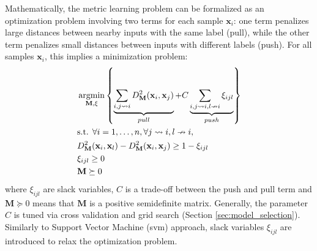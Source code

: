 %
Mathematically, the metric learning problem can be formalized as an optimization problem involving two terms for each sample $\textbf{x}_i$: one term penalizes large distances between nearby inputs with the same label (pull), while the other term penalizes small distances between inputs with different labels (push). For all samples $\textbf{x}_i$, this implies a minimization problem:
\begin{equation}
\begin{aligned}
&\displaystyle 		 \argmin_{\textbf{M},\xi} \left\lbrace \underbrace{
	\sum\limits_{i,j \rightsquigarrow i}
	D^2_\textbf{M}(\textbf{x}_i,\textbf{x}_j)
}_{pull}
+
C
\underbrace{
	\sum\limits_{i,j \rightsquigarrow i,l \nrightarrow i} \xi_{ijl}
}
_{push} \right\rbrace \\
&\text{s.t.  } \forall i = 1,\ldots, n, \forall j \rightsquigarrow i, l \nrightarrow i, \\
& D^2_\textbf{M}(\textbf{x}_i,\textbf{x}_l) - D^2_\textbf{M}(\textbf{x}_i,\textbf{x}_j)  \geq 1-\xi_{ijl} \\
& \xi_{ijl} \geq 0 \\
& \textbf{M} \succeq 0
\label{eq:OptimizationProblem}
\end{aligned}
\end{equation}
\noindent where $\xi_{ijl}$ are slack variables, $C$ is a trade-off between the push and pull term and $\textbf{M} \succeq 0$ means that $\textbf{M}$ is a positive semidefinite matrix. Generally, the parameter $C$ is tuned via cross validation and grid search (Section \ref{sec:model_selection}). Similarly to Support Vector Machine ({\sc svm}) approach, slack variables $\xi_{ijl}$ are introduced to relax the optimization problem. 

